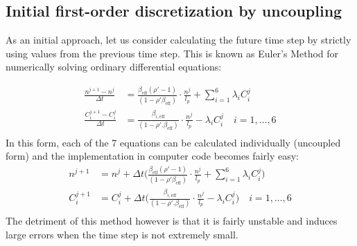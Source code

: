 \documentclass[11pt,letterpaper,titlepage]{article}
\begin{document}
\subsection{Initial first-order discretization by uncoupling}
As an initial approach, let us consider calculating the future time step by strictly using values from the previous time step. This is known as Euler's Method for numerically solving ordinary differential equations:

\begin{equation*}
\begin{aligned}
\frac{n^{j+1}-n^j}{\Delta t}&= \frac{\beta_{\mathrm{eff}}(\rho'-1)}{(1-\rho'\beta_{\mathrm{eff}})}\cdot \frac{n^j}{l_p}  + \sum_{i=1}^6 \lambda_i C_i^j \\
\frac{C_i^{j+1}-C_i^j}{\Delta t} &= \frac{\beta_{i,\mathrm{eff}}}{(1-\rho'.\beta_{\mathrm{eff}})}  \cdot   \frac{n^j}{l_p}  - \lambda_i C_i^j \quad i=1,\dots,6 \\
\end{aligned}
\end{equation*}
\newline
\noindent
In this form, each of the 7 equations can be calculated individually (uncoupled form) and the implementation in computer code becomes fairly easy:
\begin{equation}
\begin{aligned}
n^{j+1}&=n^j + \Delta t \biggr(  \frac{\beta_{\mathrm{eff}}(\rho'-1)}{(1-\rho'\beta_{\mathrm{eff}})}\cdot \frac{n^j}{l_p}  + \sum_{i=1}^6 \lambda_i C_i^j \biggr) \\
C_i^{j+1}  &=C_i^j +  \Delta t \biggr(  \frac{\beta_{i,\mathrm{eff}}}{(1-\rho'.\beta_{\mathrm{eff}})}  \cdot   \frac{n^j}{l_p}  - \lambda_i C_i^j \biggr) \quad i=1,\dots,6 \\
\end{aligned}
\end{equation}
\newline
\noindent
The detriment of this method however is that it is fairly unstable and induces large errors when the time step is not extremely small.
\end{document}
